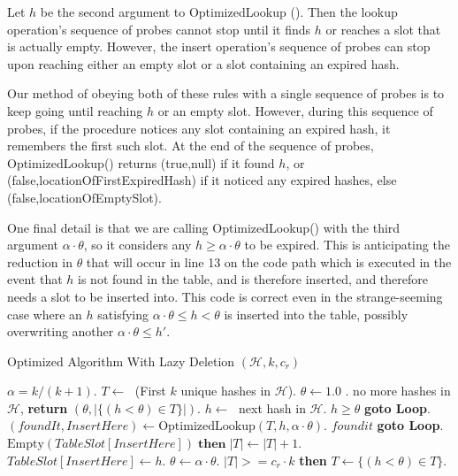 \documentclass{sig-alternate}
\begin{document}
Let $h$ be the second argument to OptimizedLookup (). Then the lookup operation's sequence of probes cannot stop until
it finds $h$ or reaches a slot that is actually empty. However, the insert operation's sequence of probes
can stop upon reaching either an empty slot or a slot containing an expired hash.

Our method of obeying both of these rules with a single sequence of probes is to keep going
until reaching $h$ or an empty slot. However, during this sequence of probes, if the procedure
notices any slot containing an expired hash, it remembers the first such slot. At the end
of the sequence of probes, OptimizedLookup() returns (true,null) if it found $h$, or 
(false,locationOfFirstExpiredHash) if it noticed any expired hashes, else 
(false,locationOfEmptySlot).

One final detail is that we are calling OptimizedLookup() with the
third argument $\alpha \cdot \theta$, so it considers any $h \ge
\alpha \cdot \theta$ to be expired. This is anticipating the reduction in 
$\theta$ that will occur in line 13 on the code path which is executed in the
event that $h$ is not found in the table, and is therefore inserted, and therefore needs
a slot to be inserted into.
This code is correct even in the strange-seeming case where an $h$ satisfying
$\alpha \cdot \theta \le h < \theta$ is inserted into the table, possibly overwriting another 
$\alpha \cdot \theta \le h'$.


\begin{algorithm}[t]
\caption{Optimized Algorithm With Lazy Deletion $(\mathcal{H},k,c_r)$}
\label{alg:optimized-algo}
\begin{algorithmic}[1]{\footnotesize
\STATE $\alpha = k/(k+1)$.
\STATE $T \leftarrow\;$ (First $k$ unique hashes in $\mathcal{H}$).
\STATE $ \theta \leftarrow 1.0 $
\STATE {}.
 no more hashes in $\mathcal{H}$, {\bf return} $(\theta,|\{(h < \theta) \in T\}|)$.
\STATE $h \leftarrow\;$ next hash in $\mathcal{H}$.
 $h \ge \theta$ {\bf goto Loop}.
\STATE $(foundIt,InsertHere) \leftarrow \mathrm{OptimizedLookup}(T,h,\alpha \cdot \theta)$.
 $foundit$ {\bf goto Loop}.
 $\mathrm{Empty}(TableSlot[InsertHere])\;\mathbf{then}\; |T| \leftarrow |T|\!+\!1$.
\STATE $TableSlot[InsertHere] \leftarrow h$.
\STATE $\theta \leftarrow \alpha \cdot \theta$.
 $|T| >= c_r \cdot k$ {\bf then} $T \leftarrow \{(h < \theta) \in T\}$.
}\end{algorithmic}
\end{algorithm}
\end{document}
